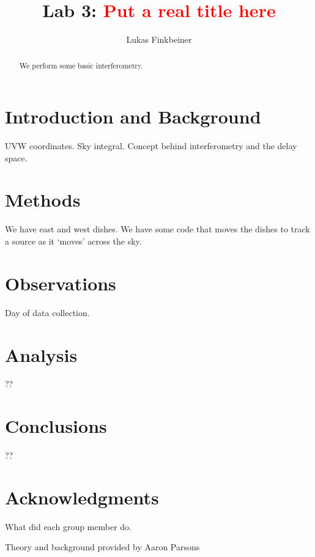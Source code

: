 \documentclass[12pt]{article}
\title{Lab 3: \textcolor{red}{Put a real title here}}
\author{Lukas Finkbeiner}
\begin{document}
\maketitle

\begin{abstract}

We perform some basic interferometry.

\end{abstract}

\section{Introduction and Background}

UVW coordinates. Sky integral. Concept behind interferometry and the delay space.

\section{Methods}

We have east and west dishes. We have some code that moves the dishes to track a source as it `moves' across the sky.

\section{Observations}

Day of data collection.

\section{Analysis}

??

\section{Conclusions}

??

\section{Acknowledgments}

What did each group member do.

Theory and background provided by Aaron Parsons


\end{document}
